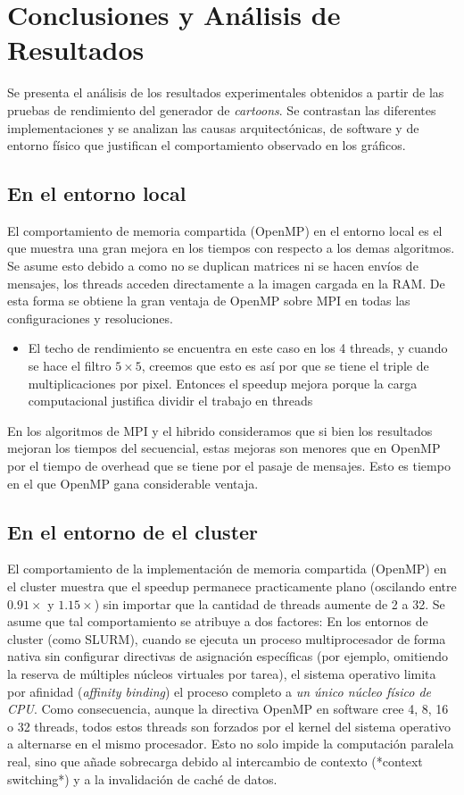 \chapter{Conclusiones y Análisis de Resultados}

Se presenta el análisis de los resultados experimentales obtenidos a partir 
de las pruebas de rendimiento del generador de \textit{cartoons}. Se contrastan las diferentes 
implementaciones y se analizan las causas arquitectónicas, de software y de entorno físico que justifican el comportamiento observado en los gráficos.

\section{En el entorno local}

El comportamiento de memoria compartida (OpenMP) en el entorno local es el que muestra una gran mejora en los tiempos con respecto a los demas algoritmos. Se asume esto debido a como no se duplican matrices ni se hacen envíos de mensajes, los threads acceden directamente a la imagen cargada en la RAM. De esta forma se obtiene la gran ventaja de OpenMP sobre MPI en todas las configuraciones y resoluciones.
\begin{itemize}
    \item El techo de rendimiento se encuentra en este caso en los 4 threads, y cuando se hace el filtro $5\times 5$, creemos que esto es así por que se tiene el triple de multiplicaciones por pixel. Entonces el speedup mejora porque la carga computacional justifica dividir el trabajo en threads
\end{itemize}

En los algoritmos de MPI y el hibrido consideramos que si bien los resultados mejoran los tiempos del secuencial, estas mejoras son menores que en OpenMP por el tiempo de overhead que se tiene por el pasaje de mensajes. Esto es tiempo en el que OpenMP gana considerable ventaja. 
    

\section{En el entorno de el cluster}

El comportamiento de la implementación de memoria compartida (OpenMP) en el cluster muestra que el speedup permanece practicamente plano (oscilando entre $0.91\times$ y $1.15\times$) sin importar que la cantidad de threads aumente de 2 a 32. 
Se asume que tal comportamiento se atribuye a dos factores:
En los entornos de cluster (como SLURM), cuando se ejecuta un proceso multiprocesador de forma nativa sin configurar directivas de asignación específicas (por ejemplo, omitiendo la reserva de múltiples núcleos virtuales por tarea), el sistema operativo limita por afinidad (\textit{affinity binding}) el proceso completo a \textit{un único núcleo físico de CPU}. 
Como consecuencia, aunque la directiva OpenMP en software cree 4, 8, 16 o 32 threads, todos estos threads son forzados por el kernel del sistema operativo a alternarse en el mismo procesador. Esto no solo impide la computación paralela real, sino que añade sobrecarga debido al intercambio de contexto (*context switching*) y a la invalidación de caché de datos.
    
